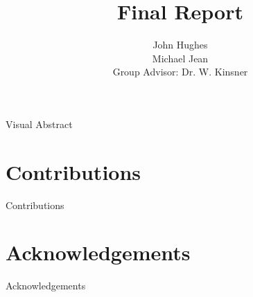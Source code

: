 \documentclass[english]{scrreprt}
\begin{document}


\subject{Design and implementation of a distributed automotive sensor/actuator network}
\title{Final Report}

\author{John Hughes\\ Michael Jean\\ Group Advisor: Dr. W. Kinsner}

\maketitle

{} \label{visual_abstract}
Visual Abstract

\begin{abstract}

\end{abstract}

\chapter*{Contributions}
Contributions

\chapter*{Acknowledgements}
Acknowledgements

\renewcommand{\contentsname}{Table of Contents}
\tableofcontents{}

\newpage
{} \label{listoffig}
\listoffigures

\newpage
{} \label{listoftab}
\listoftables

\newpage
{} \label{nomenclature}
\printnomenclature{}

\newpage











\end{document}
